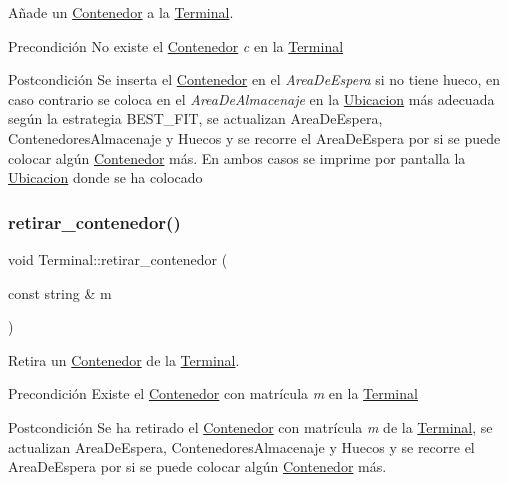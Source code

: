 Añade un \hyperlink{class_contenedor}{Contenedor} a la \hyperlink{class_terminal}{Terminal}. 

\begin{DoxyPrecond}{Precondición}
No existe el \hyperlink{class_contenedor}{Contenedor} {\itshape c} en la \hyperlink{class_terminal}{Terminal} 
\end{DoxyPrecond}
\begin{DoxyPostcond}{Postcondición}
Se inserta el \hyperlink{class_contenedor}{Contenedor} en el {\itshape Area\+De\+Espera} si no tiene hueco, en caso contrario se coloca en el {\itshape Area\+De\+Almacenaje} en la \hyperlink{class_ubicacion}{Ubicacion} más adecuada según la estrategia B\+E\+S\+T\+\_\+\+F\+IT, se actualizan Area\+De\+Espera, Contenedores\+Almacenaje y Huecos y se recorre el Area\+De\+Espera por si se puede colocar algún \hyperlink{class_contenedor}{Contenedor} más. En ambos casos se imprime por pantalla la \hyperlink{class_ubicacion}{Ubicacion} donde se ha colocado 
\end{DoxyPostcond}
\mbox{\label{class_terminal_a4a5b00174efb9993ead60369d206375b}} 
\subsubsection{\texorpdfstring{retirar\+\_\+contenedor()}{retirar\_contenedor()}}
{\footnotesize\ttfamily void Terminal\+::retirar\+\_\+contenedor (\begin{DoxyParamCaption}\item[{const string \&}]{m }\end{DoxyParamCaption})}



Retira un \hyperlink{class_contenedor}{Contenedor} de la \hyperlink{class_terminal}{Terminal}. 

\begin{DoxyPrecond}{Precondición}
Existe el \hyperlink{class_contenedor}{Contenedor} con matrícula {\itshape m} en la \hyperlink{class_terminal}{Terminal} 
\end{DoxyPrecond}
\begin{DoxyPostcond}{Postcondición}
Se ha retirado el \hyperlink{class_contenedor}{Contenedor} con matrícula {\itshape m} de la \hyperlink{class_terminal}{Terminal}, se actualizan Area\+De\+Espera, Contenedores\+Almacenaje y Huecos y se recorre el Area\+De\+Espera por si se puede colocar algún \hyperlink{class_contenedor}{Contenedor} más. 
\end{DoxyPostcond}
\mbox{\label{class_terminal_a122e5521bd57ee9ac07db30f5f82a346}} 
